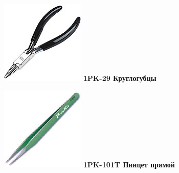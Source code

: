 \documentclass{magazine}
\begin{document}
{\noindent\includegraphics[width=\columnwidth]{fig/00/pros/1PK-29.jpg}
\textbf{1PK-29 Круглогубцы}

\noindent\includegraphics[width=\columnwidth]{fig/00/pros/1PK-101T.jpg}
\textbf{1PK-101T Пинцет прямой}

}
\end{document}
